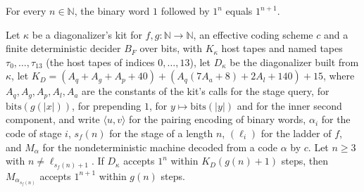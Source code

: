 \begin{theorem}
\label{Turing.NTimeDiag.dz_ones_succ}
\leanok
{}
For every $n \in \mathbb{N}$, the binary word $1$ followed by $1^n$ equals $1^{n+1}$.
\end{theorem}

\begin{theorem}
\label{Turing.NTimeDiag.dz_mid_sound}
\leanok
{}
Let $\kappa$ be a diagonalizer's kit for $f, g : \mathbb{N} \to \mathbb{N}$, an effective coding scheme $c$ and a finite deterministic decider $B_F$ over bits, with $K_\kappa$ host tapes and named tapes $\tau_0, \dots, \tau_{13}$ (the host tapes of indices $0, \dots, 13$), let $D_\kappa$ be the diagonalizer built from $\kappa$, let $K_D = (A_q + A_g + A_p + 40) + (A_q(7A_a + 8) + 2A_l + 140) + 15$, where $A_q, A_g, A_p, A_l, A_a$ are the constants of the kit's calls for the stage query, for $\mathrm{bits}(g(|x|))$, for prepending $1$, for $y \mapsto \mathrm{bits}(|y|)$ and for the inner second component, and write $\langle u, v\rangle$ for the pairing encoding of binary words, $\alpha_i$ for the code of stage $i$, $s_f(n)$ for the stage of a length $n$, $(\ell_i)$ for the ladder of $f$, and $M_\alpha$ for the nondeterministic machine decoded from a code $\alpha$ by $c$. Let $n \ge 3$ with $n \ne \ell_{s_f(n) + 1}$. If $D_\kappa$ accepts $1^n$ within $K_D(g(n) + 1)$ steps, then $M_{\alpha_{s_f(n)}}$ accepts $1^{n+1}$ within $g(n)$ steps.
\end{theorem}


